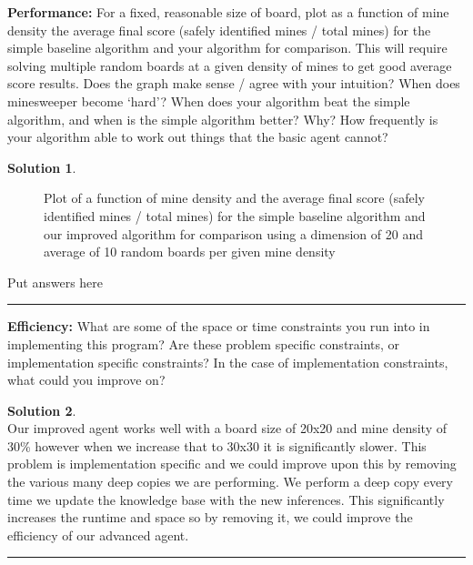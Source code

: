 \documentclass{article}
\theoremstyle{definition}
\def\fline{\rule{0.75\linewidth}{0.5pt}}
\newcommand{\finishline}{\vspace{-15pt}\begin{center}\fline\end{center}}
\newtheorem*{solution*}{Solution}
\newenvironment{solution}{\begin{solution*}}{{\finishline} \end{solution*}}
\begin{document}
\textbf{Performance: }
For a fixed, reasonable size of board, plot as a function of mine density the average final score (safely identified mines / total mines) for the simple baseline algorithm and your algorithm for comparison. This will require solving multiple random boards at a given density of mines to get good average score results.
Does the graph make sense / agree with your intuition? When does minesweeper become ‘hard’?
When does your algorithm beat the simple algorithm, and when is the simple algorithm better? Why?
How frequently is your algorithm able to work out things that the basic agent cannot?
\begin{solution} \hfill

    \begin{figure}[H]
	\centering
	\caption{Plot of a function of mine density and the average final score (safely identified mines / total mines) for the simple baseline algorithm and our improved algorithm for comparison using a dimension of 20 and average of 10 random boards per given mine density}
	\end{figure}
	
    Put answers here
	
\end{solution}
\smallskip

\textbf{Efficiency: }
What are some of the space or time constraints you run into in implementing this program? 
Are these problem specific constraints, or implementation specific constraints? 
In the case of implementation constraints, what could you improve on?
\begin{solution} \hfill \\
    Our improved agent works well with a board size of 20x20 and mine density of 30\% however when we increase that to 30x30 it is significantly slower.
    This problem is implementation specific and we could improve upon this by removing the various many deep copies we are performing. We perform a deep copy every time we update the knowledge base with the new inferences. This significantly increases the runtime and space so by removing it, we could improve the efficiency of our advanced agent.
\end{solution}
\end{document}
